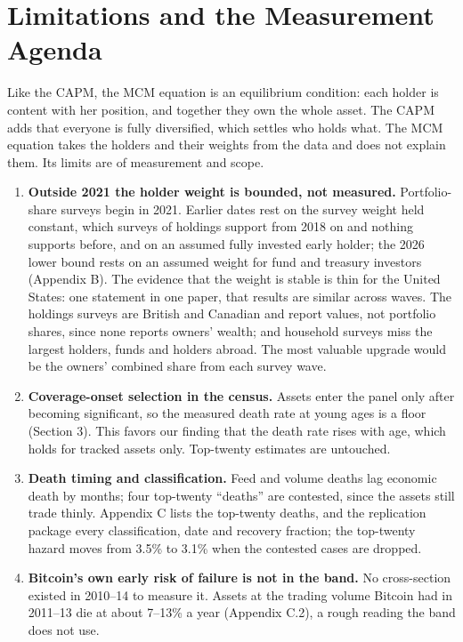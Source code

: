 \documentclass[11pt]{article}
\begin{document}
\section{Limitations and the Measurement Agenda}

Like the CAPM, the MCM equation is an equilibrium condition: each holder is content with her position, and together they own the whole asset. The CAPM adds that everyone is fully diversified, which settles who holds what. The MCM equation takes the holders and their weights from the data and does not explain them. Its limits are of measurement and scope.

\begin{enumerate}
\item \textbf{Outside 2021 the holder weight is bounded, not measured.} Portfolio-share surveys begin in 2021. Earlier dates rest on the survey weight held constant, which surveys of holdings support from 2018 on and nothing supports before, and on an assumed fully invested early holder; the 2026 lower bound rests on an assumed weight for fund and treasury investors (Appendix B). The evidence that the weight is stable is thin for the United States: one statement in one paper, that results are similar across waves. The holdings surveys are British and Canadian and report values, not portfolio shares, since none reports owners' wealth; and household surveys miss the largest holders, funds and holders abroad. The most valuable upgrade would be the owners' combined share from each survey wave.
\item \textbf{Coverage-onset selection in the census.} Assets enter the panel only after becoming significant, so the measured death rate at young ages is a floor (Section 3). This favors our finding that the death rate rises with age, which holds for tracked assets only. Top-twenty estimates are untouched.
\item \textbf{Death timing and classification.} Feed and volume deaths lag economic death by months; four top-twenty ``deaths'' are contested, since the assets still trade thinly. Appendix C lists the top-twenty deaths, and the replication package every classification, date and recovery fraction; the top-twenty hazard moves from 3.5\% to 3.1\% when the contested cases are dropped.
\item \textbf{Bitcoin's own early risk of failure is not in the band.} No cross-section existed in 2010--14 to measure it. Assets at the trading volume Bitcoin had in 2011--13 die at about 7--13\% a year (Appendix C.2), a rough reading the band does not use.

\end{enumerate}
\end{document}
